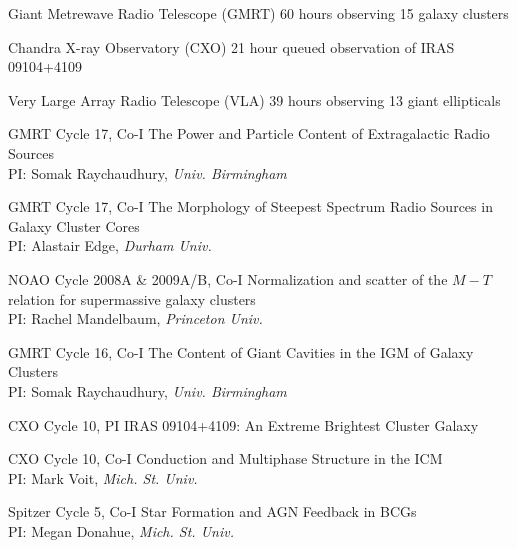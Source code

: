 \documentclass[11pt]{cv}
\begin{document}
\begin{llist}


Giant Metrewave Radio Telescope (GMRT)
60 hours observing 15 galaxy clusters

Chandra X-ray Observatory (CXO)
21 hour queued observation of IRAS 09104+4109

Very Large Array Radio Telescope (VLA)
39 hours observing 13 giant ellipticals



GMRT Cycle 17, Co-I
The Power and Particle Content of Extragalactic Radio Sources\\%
PI: Somak Raychaudhury, {\textit{Univ. Birmingham}}

GMRT Cycle 17, Co-I
The Morphology of Steepest Spectrum Radio Sources in Galaxy Cluster Cores\\%
PI: Alastair Edge, {\textit{Durham Univ.}}

NOAO Cycle 2008A \& 2009A/B, Co-I
Normalization and scatter of the $M-T$ relation for supermassive galaxy clusters\\
PI: Rachel Mandelbaum, {\textit{Princeton Univ.}}

GMRT Cycle 16, Co-I
The Content of Giant Cavities in the IGM of Galaxy Clusters\\%
PI: Somak Raychaudhury, {\textit{Univ. Birmingham}}

CXO Cycle 10, PI
IRAS 09104+4109: An Extreme Brightest Cluster Galaxy%

CXO Cycle 10, Co-I
Conduction and Multiphase Structure in the ICM\\%
PI: Mark Voit, {\textit{Mich. St. Univ.}}

Spitzer Cycle 5, Co-I
Star Formation and AGN Feedback in BCGs\\%
PI: Megan Donahue, {\textit{Mich. St. Univ.}}


\end{llist}
\end{document}
